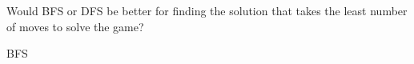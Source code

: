 \begin{blocksection}
\question Would BFS or DFS be better for finding the solution that takes the
least number of moves to solve the game?

\begin{solution}[0.25in]
BFS
\end{solution}
\end{blocksection}
